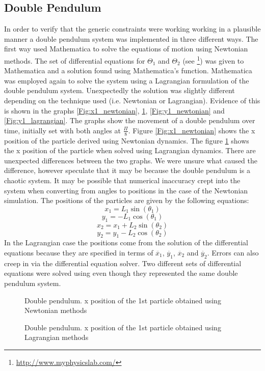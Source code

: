 \subsection{Double Pendulum}
In order to verify that the generic constraints were working working in a
plausible manner a double pendulum system was implemented in three different
ways. The first way used Mathematica to solve the equations of motion using
Newtonian methods. The set of differential equations for $\Theta_1$ and
$\Theta_2$ (see \footnote{\url{http://www.myphysicslab.com/}}) was given to
Mathematica and a solution found using Mathematica's 
function.  Mathematica was employed again to solve the system using a Lagrangian
formulation of the double pendulum system.  Unexpectedly the solution was
slightly different depending on the technique used (i.e.  Newtonian or
Lagrangian). Evidence of this is shown in the graphs \ref{Fig:x1_newtonian},
\ref{Fig:x1_lagrangian}, \ref{Fig:y1_newtonian} and \ref{Fig:y1_lagrangian}. The
graphs show the movement of a double pendulum over time, initially set with both
angles at $\frac{\Pi}{8}$. Figure \ref{Fig:x1_newtonian} shows the x position of
the particle derived using Newtonian dynamics. The figure
\ref{Fig:x1_lagrangian} shows the x position of the particle when solved using
Lagrangian dynamics.  There are unexpected differences between the two graphs.
We were unsure what caused the difference, however speculate that it may be
because the double pendulum is a chaotic system. It may be possible that
numerical inaccuracy crept into the system when converting from angles to
positions in the case of the Newtonian simulation. The positions of the
particles are given by the following equations:
\begin{equation}
x_1 = L_1 \sin(\theta_1)
\end{equation}
\begin{equation}
y_1 = -L_1 \cos(\theta_1)
\end{equation}
\begin{equation}
x_2 = x_1 + L_2 \sin(\theta_2)
\end{equation}
\begin{equation}
y_2 = y_1 - L_2 \cos(\theta_2)
\end{equation}
In the Lagrangian case the positions come from the solution of the differential
equations because they are specified in terms of $\ddot{x_1}$, $\ddot{y_1}$,
$\ddot{x_2}$ and $\ddot{y_2}$. Errors can also creep in via the differential
equation solver. Two different sets of differential equations were solved using
 even though they represented the same double pendulum
system.
\begin{figure}
	\begin{center}
	\end{center}
    \caption{\label{Fig:x1_newtonian}Double pendulum. x position of the 1st particle obtained using Newtonian methods}
	\begin{center}
	\end{center}
    \caption{\label{Fig:x1_lagrangian}Double pendulum. x position of the 1st particle obtained using Lagrangian methods}
\end{figure}

